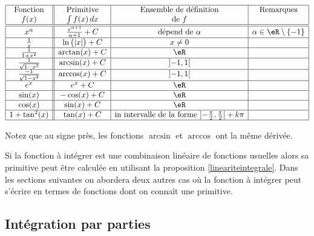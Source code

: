 \label{PageLCHooMbWjOj}
\begin{equation*}
    \begin{array}[]{|c||c|c|c|}
        \hline
        \text{Fonction}&\text{Primitive}&\text{Ensemble de définition}&\text{Remarques}\\
        f(x)&\int f(x)\, dx& \text{de } f&\\
        \hline\hline
        x^{\alpha}&\frac{ x^{\alpha+1} }{ \alpha+1 } + C& \text{dépend de }\alpha&  \alpha\in \eR\setminus\{ -1 \}  \\
        \hline
        \frac{1}{ x }&\ln\big( | x | \big) + C&x\neq 0&\\
        \hline
        \frac{1}{ 1+x^2 }&\arctan(x) + C&\eR&\\
        \hline
        \frac{1}{ \sqrt{1-x^2} }&\arcsin(x) + C&\mathopen] -1 , 1 \mathclose[&\\
        \hline
        \frac{-1}{ \sqrt{1-x^2} }&\arccos(x) + C&\mathopen] -1 , 1 \mathclose[&\\
        \hline
        e^x&e^x + C&\eR&\\
        \hline
        \sin(x)&-\cos(x) + C&\eR&\\
        \hline
        \cos(x)&\sin(x) + C&\eR&\\
        \hline
    1+\tan^2(x)&\tan(x) + C&\text{in intervalle de la forme }\mathopen] -\frac{ \pi }{2} , \frac{ \pi }{2} \mathclose[+k\pi&\\
        \hline
    \end{array}
\end{equation*}



Notez que au signe près, les fonctions \( \arcsin \) et \( \arccos\) ont la même dérivée.

Si la fonction à intégrer est une combinaison linéaire de fonctions usuelles alors sa primitive peut \^etre calculée en utilisant la proposition \ref{lineariteintegrale}. Dans les sections suivantes on abordera deux autres cas où la fonction à intégrer peut s'écrire en termes de fonctions dont on connaît une primitive.

\subsection{Intégration par parties}

